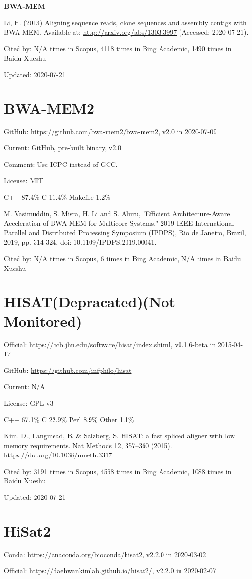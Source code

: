 \documentclass[]{article}
\newcommand{\nm}{{\color{red}(Not Monitored)}}
\newcommand{\de}{{\color{red}(Depracated)}}
\newcommand{\cb}[3]{\par Cited by: {\color{blue}\Huge #1} times in Scopus, {\color{blue}\Huge #2} times in Bing Academic, {\color{blue}\Huge #3} times in Baidu Xueshu}
\begin{document}
\textbf{BWA-MEM}

Li, H. (2013) Aligning sequence reads, clone sequences and assembly contigs with BWA-MEM. Available at: \url{http://arxiv.org/abs/1303.3997} (Accessed: 2020-07-21).\cb{N/A}{4118}{1490}

Updated: 2020-07-21

\section{BWA-MEM2}

GitHub: \url{https://github.com/bwa-mem2/bwa-mem2}, v2.0 in 2020-07-09

Current: GitHub, pre-built binary, v2.0

Comment: Use ICPC instead of GCC.

License: MIT

C++ 87.4\% C 11.4\% Makefile 1.2\%

M. Vasimuddin, S. Misra, H. Li and S. Aluru, "Efficient Architecture-Aware Acceleration of BWA-MEM for Multicore Systems," 2019 IEEE International Parallel and Distributed Processing Symposium (IPDPS), Rio de Janeiro, Brazil, 2019, pp. 314-324, doi: 10.1109/IPDPS.2019.00041.\cb{N/A}{6}{N/A}

\section{HISAT\de\nm}

Official: \url{https://ccb.jhu.edu/software/hisat/index.shtml}, v0.1.6-beta in 2015-04-17

GitHub: \url{https://github.com/infphilo/hisat}

Current: N/A

License: GPL v3

C++ 67.1\% C 22.9\% Perl 8.9\% Other 1.1\%

Kim, D., Langmead, B. \& Salzberg, S. HISAT: a fast spliced aligner with low memory requirements. Nat Methods 12, 357–360 (2015). \url{https://doi.org/10.1038/nmeth.3317}\cb{3191}{4568}{1088}

Updated: 2020-07-21

\section{HiSat2}

Conda: \url{https://anaconda.org/bioconda/hisat2}, v2.2.0 in 2020-03-02

Official: \url{https://daehwankimlab.github.io/hisat2/}, v2.2.0 in 2020-02-07
\end{document}
